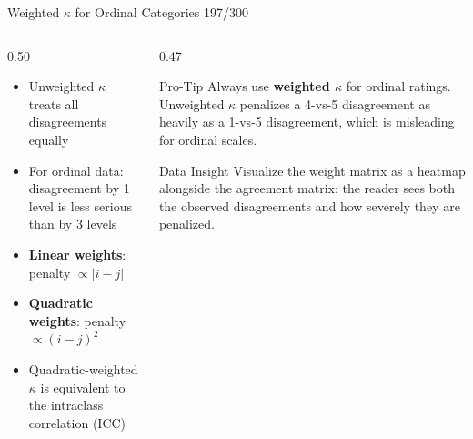 \documentclass[10pt]{beamer}
\newcommand{\smark}[1]{\hfill{\scriptsize\color{codegray}#1}}
\begin{document}
\begin{frame}{Weighted $\kappa$ for Ordinal Categories}
\smark{197/300}
\begin{columns}[T]
\begin{column}{0.50\textwidth}
\begin{itemize}
    \item Unweighted $\kappa$ treats all disagreements equally
    \item For ordinal data: disagreement by 1 level is less serious than by 3 levels
    \item \textbf{Linear weights}: penalty $\propto |i - j|$
    \item \textbf{Quadratic weights}: penalty $\propto (i - j)^2$
    \item Quadratic-weighted $\kappa$ is equivalent to the intraclass correlation (ICC)
\end{itemize}
\end{column}
\begin{column}{0.47\textwidth}
\begin{alertblock}{Pro-Tip}
    \scriptsize Always use \textbf{weighted $\kappa$} for ordinal ratings. Unweighted $\kappa$ penalizes a 4-vs-5 disagreement as heavily as a 1-vs-5 disagreement, which is misleading for ordinal scales.
\end{alertblock}
\vspace{0.1cm}
\begin{exampleblock}{Data Insight}
    \scriptsize Visualize the weight matrix as a heatmap alongside the agreement matrix: the reader sees both the observed disagreements and how severely they are penalized.
\end{exampleblock}
\end{column}
\end{columns}
\end{frame}
\end{document}
